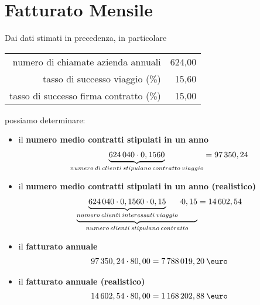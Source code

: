 \section[Fatturato Mensile]{Fatturato Mensile}
Dai dati stimati in precedenza, in particolare
\newline
\begin{center}
	\begin{tabular}{rr}
		numero di chiamate azienda annuali & 624\thinspace 040,00 \\
		tasso di successo viaggio (\%) & 15,60 \\
		tasso di successo firma contratto (\%) & 15,00 \\	
	\end{tabular}
\end{center}
possiamo determinare:
\begin{itemize}
\item il \textbf{numero medio contratti stipulati in un anno}
	\begin{equation}
	\label{eq:num_contratti_teorico_anno}
	\begin{split}
		\underbrace{624\thinspace 040 \cdot 0,1560}_{numero\: di\: clienti\: stipulano \: contratto \: viaggio } = 97\thinspace 350,24
	\end{split}
	\end{equation}

\item il \textbf{numero medio contratti stipulati in un anno (realistico)}
	\begin{equation}
	\label{eq:num_contratti_realistico_anno}
	\begin{split}
		\underbrace{\underbrace{624\thinspace 040 \cdot 0,1560 \cdot 0,15}_{numero\: clienti\: interessati \: viaggio } \cdot 0,15}_{numero \: clienti \: stipulano \: contratto} = 14\thinspace 602,54
	\end{split}
	\end{equation}

\item il \textbf{fatturato annuale}
	\begin{equation}
	\label{eq:fatturato_teorico_anno_netto}
	\begin{split}
		97\thinspace 350,24 \cdot 80,00 = 7\thinspace 788\thinspace 019,20 \: \mbox{\euro} 
	\end{split}
	\end{equation}	
	
\item il \textbf{fatturato annuale (realistico)}
	\begin{equation}
	\label{eq:fatturato_anno_netto}
	\begin{split}
		14\thinspace 602,54 \cdot 80,00 = 1\thinspace 168\thinspace 202,88 \: \mbox{\euro} 
	\end{split}
	\end{equation}


\end{itemize}
